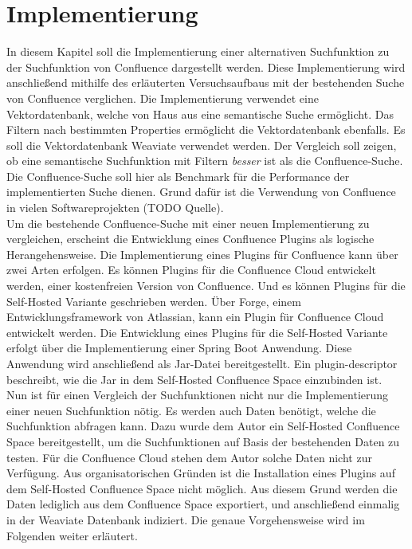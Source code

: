 \chapter{Implementierung}
In diesem Kapitel soll die Implementierung einer alternativen Suchfunktion zu der Suchfunktion von Confluence dargestellt werden.
Diese Implementierung wird anschließend mithilfe des erläuterten Versuchsaufbaus mit der bestehenden Suche von Confluence verglichen.
Die Implementierung verwendet eine Vektordatenbank, welche von Haus aus eine semantische Suche ermöglicht.
Das Filtern nach bestimmten Properties ermöglicht die Vektordatenbank ebenfalls.
Es soll die Vektordatenbank Weaviate verwendet werden.
Der Vergleich soll zeigen, ob eine semantische Suchfunktion mit Filtern \textit{besser} ist als die Confluence-Suche.
Die Confluence-Suche soll hier als Benchmark für die Performance der implementierten Suche dienen.
Grund dafür ist die Verwendung von Confluence in vielen Softwareprojekten (TODO Quelle).\\

Um die bestehende Confluence-Suche mit einer neuen Implementierung zu vergleichen, erscheint die Entwicklung eines Confluence Plugins als logische Herangehensweise.
Die Implementierung eines Plugins für Confluence kann über zwei Arten erfolgen.
Es können Plugins für die Confluence Cloud entwickelt werden, einer kostenfreien Version von Confluence.
Und es können Plugins für die Self-Hosted Variante geschrieben werden.
Über Forge, einem Entwicklungsframework von Atlassian, kann ein Plugin für Confluence Cloud entwickelt werden.
Die Entwicklung eines Plugins für die Self-Hosted Variante erfolgt über die Implementierung einer Spring Boot Anwendung.
Diese Anwendung wird anschließend als Jar-Datei bereitgestellt.
Ein plugin-descriptor beschreibt, wie die Jar in dem Self-Hosted Confluence Space einzubinden ist.\\

Nun ist für einen Vergleich der Suchfunktionen nicht nur die Implementierung einer neuen Suchfunktion nötig.
Es werden auch Daten benötigt, welche die Suchfunktion abfragen kann.
Dazu wurde dem Autor ein Self-Hosted Confluence Space bereitgestellt, um die Suchfunktionen auf Basis der bestehenden Daten zu testen.
Für die Confluence Cloud stehen dem Autor solche Daten nicht zur Verfügung.
Aus organisatorischen Gründen ist die Installation eines Plugins auf dem Self-Hosted Confluence Space nicht möglich.
Aus diesem Grund werden die Daten lediglich aus dem Confluence Space exportiert, und anschließend einmalig in der Weaviate Datenbank indiziert.
Die genaue Vorgehensweise wird im Folgenden weiter erläutert.

